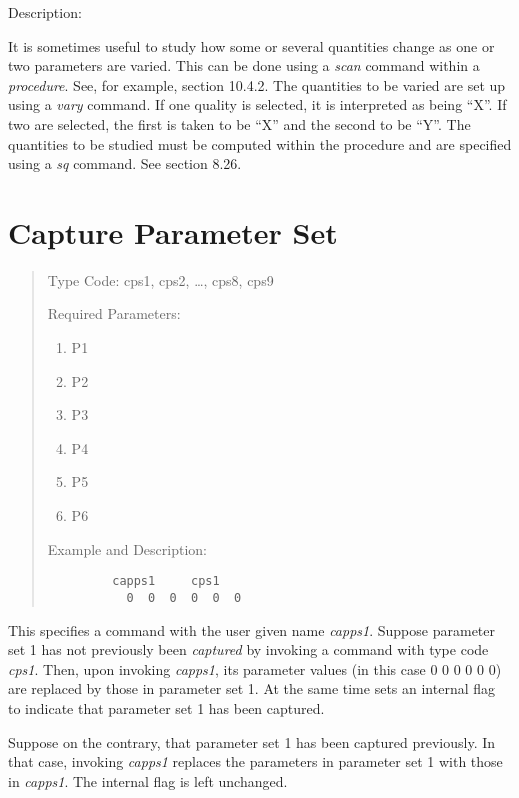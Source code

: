 \vspace{5mm}
     Description:
\vspace{2mm}

It is sometimes useful to study how some or several quantities change as one or two parameters are varied.  This can be done using a {\em scan} command within a {\em procedure}.  See, for example, section 10.4.2.  The quantities to be varied are set up using a {\em vary} command.  If one quality is selected, it is interpreted as being ``X''.  If two are selected, the first is taken to be ``X'' and the second to be ``Y''.  The quantities to be studied must be computed within the procedure and are specified using a {\em sq} command.  See section 8.26.

\newpage
\section{Capture Parameter Set} 
\begin{quotation}
\noindent Type Code:  cps1, cps2, \ldots, cps8, cps9
\vspace{5mm}

\noindent Required Parameters:
\begin{enumerate}
       \item  P1
       \item  P2
       \item  P3
       \item  P4
       \item  P5
       \item  P6
\end{enumerate}

\vspace{5mm}
\noindent Example and Description:
\begin{verbatim}
         capps1     cps1
           0  0  0  0  0  0
\end{verbatim}
\end{quotation}
This specifies a command with the user given name {\em capps1}.  Suppose parameter set 1 has not previously been {\em captured} by invoking a command with type code {\em cps1}.  Then, upon invoking {\em capps1}, its parameter values (in this case 0  0  0  0  0  0) are replaced by those in parameter set 1.  At the same time \Mary sets an internal flag to indicate that parameter set 1 has been captured.

Suppose on the contrary, that parameter set 1 has been captured previously.  In that case, invoking {\em capps1} replaces the parameters in parameter set 1 with those in {\em capps1}.  The internal flag is left unchanged.

